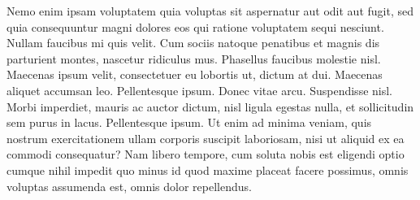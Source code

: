 Nemo enim ipsam voluptatem quia voluptas sit aspernatur aut odit aut fugit, sed quia consequuntur magni dolores eos qui ratione voluptatem sequi nesciunt. 
Nullam faucibus mi quis velit. 
Cum sociis natoque penatibus et magnis dis parturient montes, nascetur ridiculus mus. 
Phasellus faucibus molestie nisl. 
Maecenas ipsum velit, consectetuer eu lobortis ut, dictum at dui. 
Maecenas aliquet accumsan leo. 
Pellentesque ipsum. 
Donec vitae arcu. 
Suspendisse nisl. 
Morbi imperdiet, mauris ac auctor dictum, nisl ligula egestas nulla, et sollicitudin sem purus in lacus. 
Pellentesque ipsum. 
Ut enim ad minima veniam, quis nostrum exercitationem ullam corporis suscipit laboriosam, nisi ut aliquid ex ea commodi consequatur? 
Nam libero tempore, cum soluta nobis est eligendi optio cumque nihil impedit quo minus id quod maxime placeat facere possimus, omnis voluptas assumenda est, omnis dolor repellendus.
